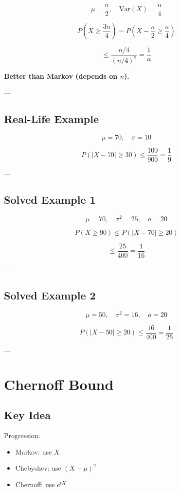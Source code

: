 \documentclass[12pt]{article}
\begin{document}
\[
\mu = \frac{n}{2}, \quad \text{Var}(X) = \frac{n}{4}
\]

\[
P\left(X \ge \frac{3n}{4}\right)
= P\left(X - \frac{n}{2} \ge \frac{n}{4}\right)
\]

\[
\le \frac{n/4}{(n/4)^2} = \frac{1}{n}
\]

\textbf{Better than Markov (depends on $n$).}

---

\subsection{Real-Life Example}

\[
\mu = 70, \quad \sigma = 10
\]

\[
P(|X - 70| \ge 30) \le \frac{100}{900} = \frac{1}{9}
\]

---

\subsection{Solved Example 1}

\[
\mu = 70, \quad \sigma^2 = 25, \quad a = 20
\]

\[
P(X \ge 90) \le P(|X-70| \ge 20)
\]

\[
\le \frac{25}{400} = \frac{1}{16}
\]

---

\subsection{Solved Example 2}

\[
\mu = 50, \quad \sigma^2 = 16, \quad a = 20
\]

\[
P(|X-50| \ge 20) \le \frac{16}{400} = \frac{1}{25}
\]

---

\section{Chernoff Bound}

\subsection{Key Idea}

Progression:
\begin{itemize}
    \item Markov: use $X$
    \item Chebyshev: use $(X-\mu)^2$
    \item Chernoff: use $e^{tX}$
\end{itemize}
\end{document}
